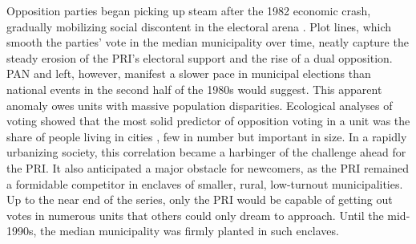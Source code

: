 \documentclass[letter,12pt]{article}
\begin{document}
Opposition parties began picking up steam after the 1982 economic crash, gradually mobilizing social discontent in the electoral arena \citep{molinar.1991a,klesner.Alignment.1993}. Plot lines, which smooth the parties' vote in the median municipality over time, neatly capture the steady erosion of the PRI's electoral support and the rise of a dual opposition. PAN and left, however, manifest a slower pace in municipal elections than national events in the second half of the 1980s would suggest. This apparent anomaly owes units with massive population disparities. Ecological analyses of voting showed that the most solid predictor of opposition voting in a unit was the share of people living in cities \citep{ames.1970,lehr.1985,magar.1994}, few in number but important in size. In a rapidly urbanizing society, this correlation became a harbinger of the challenge ahead for the PRI. It also anticipated a major obstacle for newcomers, as the PRI remained a formidable competitor in enclaves of smaller, rural, low-turnout municipalities. Up to the near end of the series, only the PRI would be capable of getting out votes in numerous units that others could only dream to approach. Until the mid-1990s, the median municipality was firmly planted in such enclaves.
\end{document}
